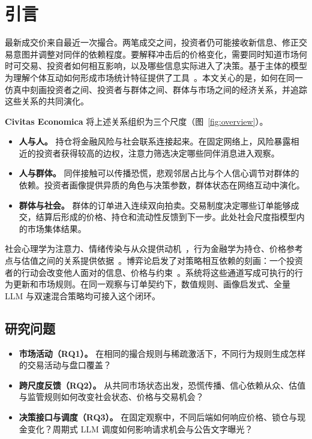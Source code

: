 \section{引言}
\label{sec:introduction}

最新成交价来自最近一次撮合。两笔成交之间，投资者仍可能接收新信息、修正交易意图并调整对同伴的依赖程度。要解释冲击后的价格变化，需要同时知道市场何时可交易、投资者如何相互影响，以及哪些信息实际进入了决策。基于主体的模型为理解个体互动如何形成市场统计特征提供了工具~\cite{cont2001empirical,lebaron2006agent,farmer2009economy,lux1999scaling}。本文关心的是，如何在同一仿真中刻画投资者之间、投资者与群体之间、群体与市场之间的经济关系，并追踪这些关系的共同演化。

\textbf{Civitas Economica} 将上述关系组织为三个尺度（图~\ref{fig:overview}）。
\begin{itemize}[leftmargin=*,itemsep=2pt]
 \item \textbf{人与人。} 持仓将金融风险与社会联系连接起来。在固定网络上，风险暴露相近的投资者获得较高的边权，注意力筛选决定哪些同伴消息进入观察。
 \item \textbf{人与群体。} 同伴接触可以传播恐慌，悲观邻居占比与个人信心调节对群体的依赖。投资者画像提供异质的角色与决策参数，群体状态在网络互动中演化。
 \item \textbf{群体与社会。} 群体的订单进入连续双向拍卖。交易制度决定哪些订单能够成交，结算后形成的价格、持仓和流动性反馈到下一步。此处社会尺度指模型内的市场集体结果。
\end{itemize}

社会心理学为注意力、情绪传染与从众提供动机~\cite{deutsch1955study,hatfield1993emotional,tajfel1979integrative}，行为金融学为持仓、价格参考点与估值之间的关系提供依据~\cite{kahneman1979prospect,tversky1992advances}。博弈论启发了对策略相互依赖的刻画：一个投资者的行动会改变他人面对的信息、价格与约束~\cite{cooper1988coordinating,keynes1936general,morris2002social}。系统将这些通道写成可执行的行为更新和市场规则。在同一观察与订单契约下，数值规则、画像启发式、全量 LLM 与双速混合策略均可接入这个闭环。

\subsection{研究问题}
\label{sec:rq_zh}

\begin{itemize}[leftmargin=*,itemsep=3pt]
 \item \textbf{市场活动（RQ1）。} 在相同的撮合规则与稀疏激活下，不同行为规则生成怎样的交易活动与盘口覆盖？
 \item \textbf{跨尺度反馈（RQ2）。} 从共同市场状态出发，恐慌传播、信心依赖从众、估值与监管规则如何改变社会状态、价格与交易机会？
 \item \textbf{决策接口与调度（RQ3）。} 在固定观察中，不同后端如何响应价格、锁仓与现金变化？周期式 LLM 调度如何影响请求机会与公告文字曝光？
\end{itemize}


